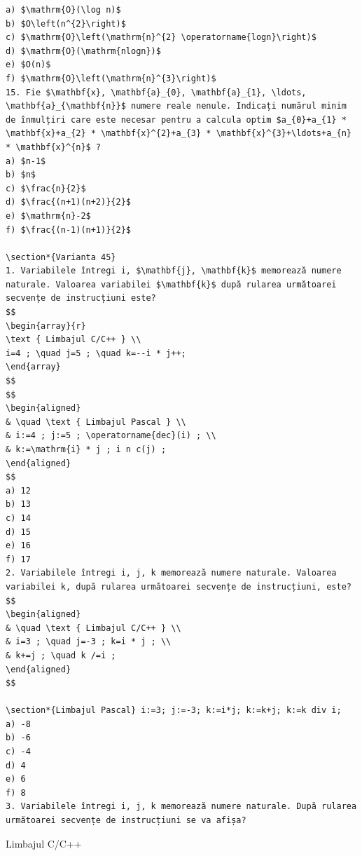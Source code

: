 \documentclass[10pt]{article}
\begin{document}
\begin{verbatim}
a) $\mathrm{O}(\log n)$
b) $O\left(n^{2}\right)$
c) $\mathrm{O}\left(\mathrm{n}^{2} \operatorname{logn}\right)$
d) $\mathrm{O}(\mathrm{nlogn})$
e) $O(n)$
f) $\mathrm{O}\left(\mathrm{n}^{3}\right)$
15. Fie $\mathbf{x}, \mathbf{a}_{0}, \mathbf{a}_{1}, \ldots, \mathbf{a}_{\mathbf{n}}$ numere reale nenule. Indicați numărul minim de înmulțiri care este necesar pentru a calcula optim $a_{0}+a_{1} * \mathbf{x}+a_{2} * \mathbf{x}^{2}+a_{3} * \mathbf{x}^{3}+\ldots+a_{n} * \mathbf{x}^{n}$ ?
a) $n-1$
b) $n$
c) $\frac{n}{2}$
d) $\frac{(n+1)(n+2)}{2}$
e) $\mathrm{n}-2$
f) $\frac{(n-1)(n+1)}{2}$

\section*{Varianta 45}
1. Variabilele întregi i, $\mathbf{j}, \mathbf{k}$ memorează numere naturale. Valoarea variabilei $\mathbf{k}$ după rularea următoarei secvențe de instrucțiuni este?
$$
\begin{array}{r}
\text { Limbajul C/C++ } \\
i=4 ; \quad j=5 ; \quad k=--i * j++;
\end{array}
$$
$$
\begin{aligned}
& \quad \text { Limbajul Pascal } \\
& i:=4 ; j:=5 ; \operatorname{dec}(i) ; \\
& k:=\mathrm{i} * j ; i n c(j) ;
\end{aligned}
$$
a) 12
b) 13
c) 14
d) 15
e) 16
f) 17
2. Variabilele întregi i, j, k memorează numere naturale. Valoarea variabilei k, după rularea următoarei secvențe de instrucțiuni, este?
$$
\begin{aligned}
& \quad \text { Limbajul C/C++ } \\
& i=3 ; \quad j=-3 ; k=i * j ; \\
& k+=j ; \quad k /=i ;
\end{aligned}
$$

\section*{Limbajul Pascal} i:=3; j:=-3; k:=i*j; k:=k+j; k:=k div i;
a) -8
b) -6
c) -4
d) 4
e) 6
f) 8
3. Variabilele întregi i, j, k memorează numere naturale. După rularea următoarei secvențe de instrucțiuni se va afișa?
\end{verbatim}

Limbajul C/C++
\end{document}
